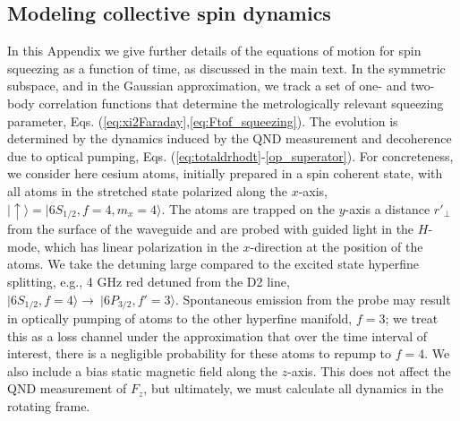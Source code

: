 \documentclass[preprint,aps,pra,onecolumn,superscriptaddress]{revtex4-1} %
\def\ket#1{\lvert{#1}\rangle}%
\begin{document}


\begin{appendix}
\section{Modeling collective spin dynamics}\label{Sec::opticalpumpinginrotatingframe}
In this Appendix we give further details of the equations of motion for spin squeezing as a function of time, as discussed in the main text.  In the symmetric subspace, and in the Gaussian approximation, we track a set of one- and two-body correlation functions that determine the metrologically relevant squeezing parameter, Eqs. (\ref{eq:xi2Faraday},\ref{eq:Ftof_squeezing}).   The evolution is determined by the dynamics induced by the QND measurement and decoherence due to optical pumping, Eqs. (\ref{eq:totaldrhodt}-\ref{op_superator}).   For concreteness, we consider here cesium atoms,  initially prepared in a spin coherent state, with all atoms in the stretched state polarized along the $x$-axis, $\ket{\uparrow} = \ket{6S_{1/2}, f=4, m_x=4}$.  The atoms are trapped on the $y$-axis a distance $r'_\perp$ from the surface of the waveguide and are probed with guided light in the $H$-mode, which has linear polarization in the $x$-direction at the position of the atoms.   We take the detuning large compared to the excited state hyperfine splitting, e.g., 4 GHz red detuned from the D2 line,  $\ket{6S_{1/2}, f=4}\rightarrow \ \ket{6P_{3/2},f'=3}$.   Spontaneous emission from the probe may result in optically pumping of atoms to the other  hyperfine manifold, $f=3$; we treat this as a loss channel under the approximation that over the time interval of interest, there is a negligible probability for these atoms to repump to $f=4$.  We also include a bias static magnetic field along the $z$-axis.  This does not affect the QND measurement of $F_z$, but ultimately, we must  calculate all dynamics in the rotating frame.


\end{appendix}
\end{document}
